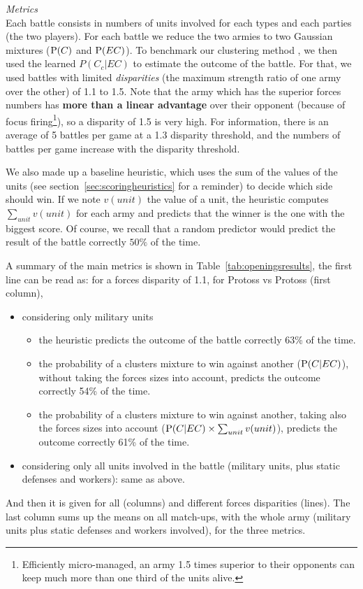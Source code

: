 \vspace{0.2cm}
\textit{Metrics}\\
Each battle consists in numbers of units involved for each types and each parties (the two players). For each battle we reduce the two armies to two Gaussian mixtures ($\mathrm{P}(C)$ and $\mathrm{P}(EC)$). To benchmark our clustering method%
, %
we then used the learned $P(C_c|EC)$ to estimate the outcome of the battle. For that, we used battles with limited \textit{disparities} (the maximum strength ratio of one army over the other) of 1.1 to 1.5. Note that the army which has the superior forces numbers has \textbf{more than a linear advantage} over their opponent (because of focus firing\footnote{Efficiently micro-managed, an army 1.5 times superior to their opponents can keep much more than one third of the units alive.}), so a disparity of 1.5 is very high. For information, there is an average of 5 battles per game at a 1.3 disparity threshold, and the numbers of battles per game increase with the disparity threshold.

We also made up a baseline heuristic, which uses the sum of the values of the units (see section~\ref{sec:scoringheuristics} for a reminder) to decide which side should win. If we note $v(unit)$ the value of a unit, the heuristic computes $\sum_{unit} v(unit)$ for each army and predicts that the winner is the one with the biggest score. Of course, we recall that a random predictor would predict the result of the battle correctly $50\%$ of the time.

A summary of the main metrics is shown in Table~\ref{tab:openingsresults}, the first line can be read as: for a forces disparity of 1.1, for Protoss vs Protoss (first column),
\begin{itemize}
    \item considering only military units
\begin{itemize}
    \item the heuristic predicts the outcome of the battle correctly 63\% of the time.
    \item the probability of a clusters mixture to win against another ($\mathrm{P}(C|EC)$), without taking the forces sizes into account, predicts the outcome correctly 54\% of the time.
    \item the probability of a clusters mixture to win against another, taking also the forces sizes into account ($\mathrm{P}(C|EC)\times \sum_{unit}v(unit)$), predicts the outcome correctly 61\% of the time.
\end{itemize}
    \item considering only all units involved in the battle (military units, plus static defenses and workers): same as above.
\end{itemize}
And then it is given for all  (columns) and different forces disparities (lines). The last column sums up the means on all match-ups, with the whole army (military units plus static defenses and workers involved), for the three metrics.

